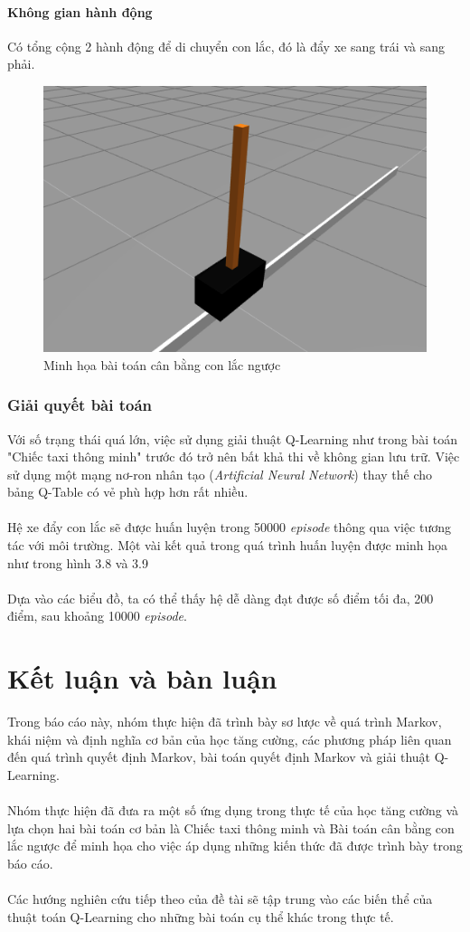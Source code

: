 \documentclass[12pt,a4paper]{report}
\begin{document}
\subsubsection{Không gian hành động}
Có tổng cộng 2 hành động để di chuyển con lắc, đó là đẩy xe sang trái và sang phải.
\begin{figure}
	\centering
	\includegraphics[scale=.6]{8}
	\caption{Minh họa bài toán cân bằng con lắc ngược}
\end{figure}
\subsection{Giải quyết bài toán}
Với số trạng thái quá lớn, việc sử dụng giải thuật Q-Learning như trong bài toán "Chiếc
taxi thông minh" trước đó trở nên bất khả thi về không gian lưu trữ. Việc sử dụng một mạng
nơ-ron nhân tạo (\textit{Artificial Neural Network}) thay thế cho bảng Q-Table có vẻ phù hợp hơn
rất nhiều. \\\\ 
Hệ xe đẩy con lắc sẽ được huấn luyện trong 50000 \textit{episode} thông qua việc tương tác với
môi trường. Một vài kết quả trong quá trình huấn luyện được minh họa như trong hình 3.8
và 3.9\\\\
Dựa vào các biểu đồ, ta có thể thấy hệ dễ dàng đạt được số điểm tối đa, 200 điểm, sau
khoảng 10000 \textit{episode}.
\chapter{Kết luận và bàn luận}
Trong báo cáo này, nhóm thực hiện đã trình bày sơ lược về quá trình Markov, khái niệm và định nghĩa cơ bản của học tăng cường, các phương pháp liên quan đến quá trình quyết
định Markov, bài toán quyết định Markov và giải thuật Q-Learning.\\\\ Nhóm thực hiện đã đưa ra một số ứng dụng trong thực tế của học tăng cường và lựa chọn hai bài toán cơ bản là Chiếc
taxi thông minh và Bài toán cân bằng con lắc ngược để minh họa cho việc áp dụng những
kiến thức đã được trình bày trong báo cáo.\\\\
Các hướng nghiên cứu tiếp theo của đề tài sẽ tập trung vào các biến thể của thuật toán
Q-Learning cho những bài toán cụ thể khác trong thực tế.
\end{document}
